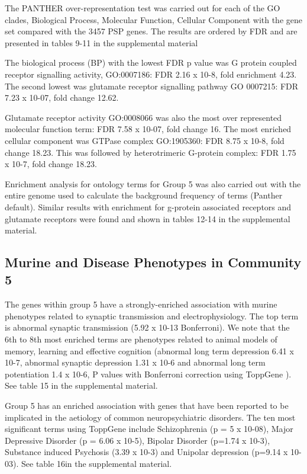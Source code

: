 The PANTHER over-representation test was carried out for each of the GO clades, Biological Process, Molecular Function, Cellular Component with the gene set compared with the 3457 PSP genes. The results are ordered by FDR and are presented in tables 9-11 in the supplemental material 

The biological process (BP) with the lowest FDR p value was G protein coupled receptor signalling activity, GO:0007186: FDR 2.16 x 10-8, fold enrichment 4.23. The second lowest was glutamate receptor signalling pathway GO 0007215: FDR 7.23 x 10-07, fold change 12.62.

Glutamate receptor activity GO:0008066 was also the most over represented molecular function term: FDR 7.58 x 10-07, fold change 16. The most enriched cellular component was GTPase complex GO:1905360: FDR 8.75 x 10-8, fold change 18.23. This was followed by heterotrimeric G-protein complex: FDR 1.75 x 10-7, fold change 18.23.

Enrichment analysis for ontology terms for Group 5 was also carried out with the entire genome  used to calculate the background frequency of terms (Panther default). Similar results with enrichment for g-protein associated receptors and glutamate receptors were found and shown in tables 12-14 in the supplemental material.

\subsection{Murine and Disease Phenotypes in Community 5}
The genes within group 5 have a strongly-enriched association with murine phenotypes related to synaptic transmission and electrophysiology. The top term is abnormal synaptic transmission (5.92 x 10-13 Bonferroni). We note that the 6th to 8th most enriched terms are phenotypes related to animal models of memory, learning and effective cognition (abnormal long term depression 6.41 x 10-7, abnormal synaptic depression 1.31 x 10-6 and abnormal long term potentiation 1.4 x 10-6, P values with Bonferroni correction using ToppGene \cite{chen2009toppgene} ). See table 15 in the supplemental material.

Group 5 has an enriched association with genes that have been reported to be implicated in the aetiology of common neuropsychiatric disorders. The ten most significant terms using ToppGene \cite{chen2009toppgene}  include Schizophrenia (p = 5 x 10-08), Major Depressive Disorder (p = 6.06 x 10-5),  Bipolar Disorder (p=1.74 x 10-3), Substance induced Psychosis  (3.39 x 10-3) and Unipolar depression (p=9.14 x 10-03). See table 16in the supplemental material.

